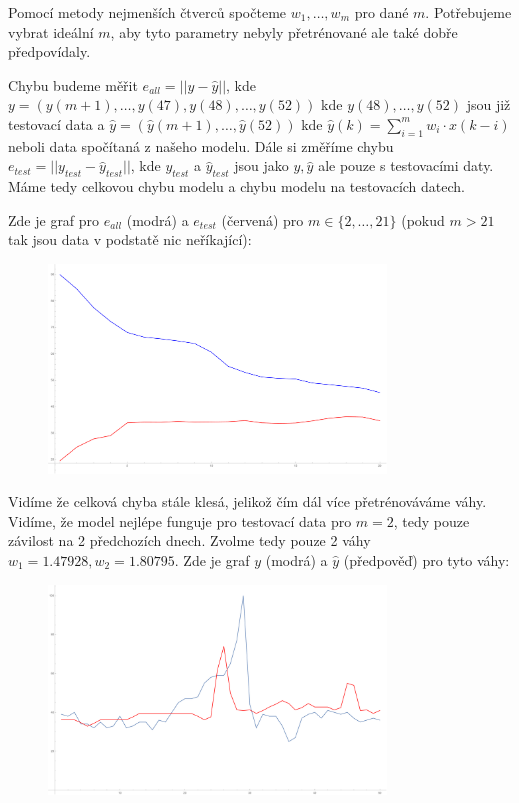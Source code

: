 \documentclass[12pt, a4paper]{article}
\begin{document}
Pomocí metody nejmenších čtverců spočteme $w_1,\dots,w_m$ pro dané $m$. Potřebujeme vybrat ideální $m$, aby tyto parametry nebyly přetrénované ale také dobře předpovídaly. 

Chybu budeme měřit $e_{all} = ||y - \hat{y}||$, kde \\$y = (y(m+1), \dots, y(47), y(48),\dots,y(52))$ kde $y(48),\dots,y(52)$ jsou již testovací data a $\hat{y} = (\hat{y}(m+1),\dots,\hat{y}(52))$ kde $\hat{y}(k)=\sum^{m}_{i=1} w_i \cdot x(k-i)$ neboli data spočítaná z našeho modelu. Dále si změříme chybu $e_{test}=||y_{test}-\hat{y}_{test}||$, kde $y_{test}$ a $\hat{y}_{test}$ jsou jako $y,\hat{y}$ ale pouze s testovacími daty. Máme tedy celkovou chybu modelu a chybu modelu na testovacích datech. 

Zde je graf pro $e_{all}$ (modrá) a $e_{test}$ (červená) pro $m \in \{2,\dots,21\}$ (pokud $m>21$ tak jsou data v podstatě nic neříkající):
\begin{figure}[h]
\centering
\includegraphics[width=0.8\textwidth]{graf_2.pdf}
\end{figure}

Vidíme že celková chyba stále klesá, jelikož čím dál více přetrénováváme váhy. Vidíme, že model nejlépe funguje pro testovací data pro $m=2$, tedy pouze závilost na 2 předchozích dnech. Zvolme tedy pouze 2 váhy $w_1 = 1.47928, w_2=1.80795$. Zde je graf $y$ (modrá) a $\hat{y}$  (předpověď) pro tyto váhy:
\begin{figure}[h]
\centering
\includegraphics[width=0.8\textwidth]{graf_2_1.pdf}
\end{figure}
\end{document}
